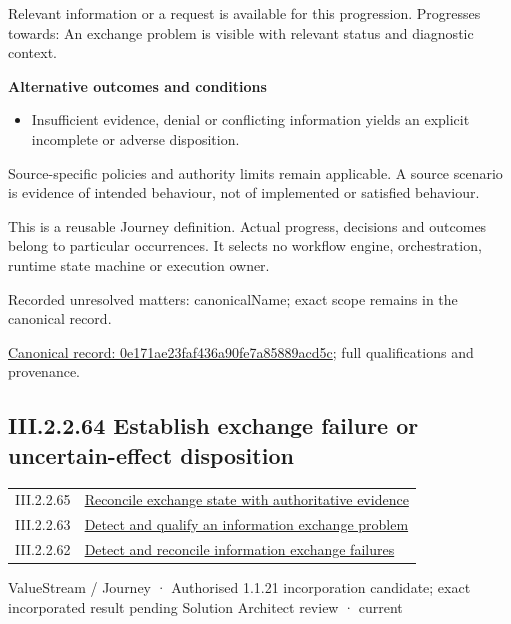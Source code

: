 Relevant information or a request is available for this progression. Progresses towards: An exchange problem is visible with relevant status and diagnostic context.



\par\medskip\textbf{Alternative outcomes and conditions}\par


\begin{itemize}


\item Insufficient evidence, denial or conflicting information yields an explicit incomplete or adverse disposition.

\end{itemize}


Source-specific policies and authority limits remain applicable. A source scenario is evidence of intended behaviour, not of implemented or satisfied behaviour.



This is a reusable Journey definition. Actual progress, decisions and outcomes belong to particular occurrences. It selects no workflow engine, orchestration, runtime state machine or execution owner.


{\small Recorded unresolved matters: canonicalName; exact scope remains in the canonical record.}\par
{\footnotesize \href{../../../../../../../continuum/strategy/value-stream/0e171ae23faf436a90fe7a85889acd5c.md}{Canonical record: 0e171ae23faf436a90fe7a85889acd5c}; full qualifications and provenance.}\par
\subsection*{III.2.2.64 Establish exchange failure or uncertain-effect disposition}
\label{navigation:III.2.2.64}

\begin{longtable}{p{.22\linewidth}p{.73\linewidth}}
III.2.2.65 & \hyperref[element:08c2d05dd0174cc28288ed4ab0bc05d2]{Reconcile exchange state with authoritative evidence} \\
III.2.2.63 & \hyperref[element:0e171ae23faf436a90fe7a85889acd5c]{Detect and qualify an information exchange problem} \\
III.2.2.62 & \hyperref[element:ad3479bfcefb4cc4b562e146f68eb579]{Detect and reconcile information exchange failures} \\
\end{longtable}
\label{element:f49ed7138ad1435a94cb1f509aaf0b8d}
{\small ValueStream / Journey · Authorised 1.1.21 incorporation candidate; exact incorporated result pending Solution Architect review · current}\par


